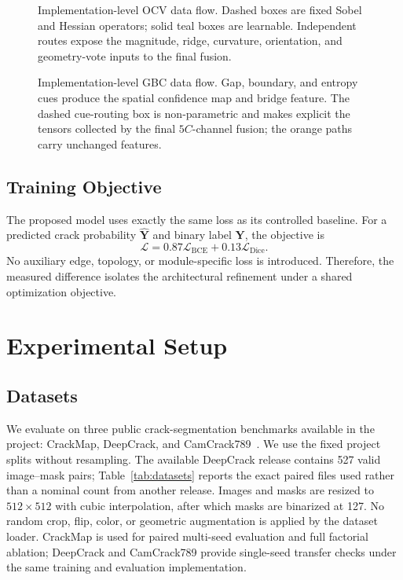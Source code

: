 \documentclass[preprint,12pt]{elsarticle}
\begin{document}
\begin{figure}[H]
\centering

\caption{Implementation-level OCV data flow. Dashed boxes are fixed Sobel and Hessian operators; solid teal boxes are learnable. Independent routes expose the magnitude, ridge, curvature, orientation, and geometry-vote inputs to the final fusion.}
\label{fig:ocv_detail}
\end{figure}

\begin{figure}[H]
\centering

\caption{Implementation-level GBC data flow. Gap, boundary, and entropy cues produce the spatial confidence map and bridge feature. The dashed cue-routing box is non-parametric and makes explicit the tensors collected by the final $5C$-channel fusion; the orange paths carry unchanged features.}
\label{fig:gbc_detail}
\end{figure}

\subsection{Training Objective}

The proposed model uses exactly the same loss as its controlled baseline. For a predicted crack probability $\hat{\mathbf{Y}}$ and binary label $\mathbf{Y}$, the objective is
\begin{equation}
\mathcal{L}=0.87\mathcal{L}_{\mathrm{BCE}}+0.13\mathcal{L}_{\mathrm{Dice}}.
\label{eq:loss}
\end{equation}
No auxiliary edge, topology, or module-specific loss is introduced. Therefore, the measured difference isolates the architectural refinement under a shared optimization objective.

\section{Experimental Setup}
\label{sec:experimental_setup}

\subsection{Datasets}

We evaluate on three public crack-segmentation benchmarks available in the project: CrackMap, DeepCrack, and CamCrack789~\cite{zou2019deepcrack,zhu2024lightweight,zhao2026mixercseg}. We use the fixed project splits without resampling. The available DeepCrack release contains 527 valid image--mask pairs; Table~\ref{tab:datasets} reports the exact paired files used rather than a nominal count from another release. Images and masks are resized to $512\times512$ with cubic interpolation, after which masks are binarized at 127. No random crop, flip, color, or geometric augmentation is applied by the dataset loader. CrackMap is used for paired multi-seed evaluation and full factorial ablation; DeepCrack and CamCrack789 provide single-seed transfer checks under the same training and evaluation implementation.
\end{document}
